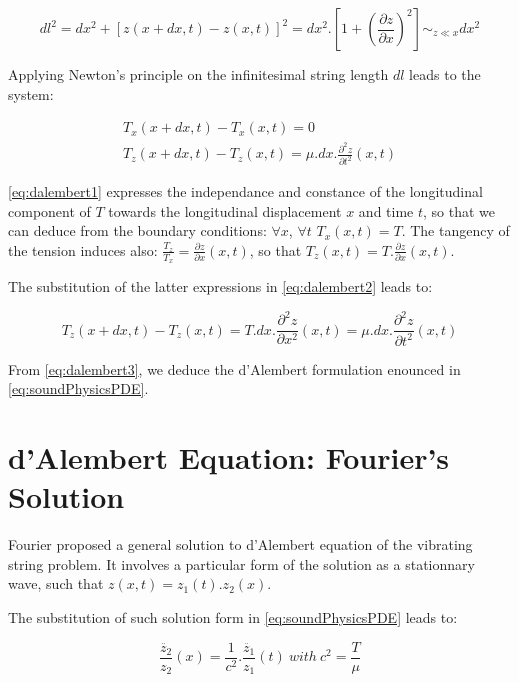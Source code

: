 $$
	dl^2 = dx^2 + [z(x+dx, t) - z(x, t)]^2 = dx^2 . [1 + (\frac{\partial{z}}{\partial{x}})^2] \sim_{z \ll x} dx^2
$$

Applying Newton's principle on the infinitesimal string length $dl$ leads to the system:

\begin{eqnarray}
	T_x(x+dx, t) - T_x(x, t) = 0  \label{eq:dalembert1} \\
   	T_z(x+dx, t) - T_z(x, t) = \mu . dx . \frac{\partial^2{z}}{\partial{t^2}}(x, t) \label{eq:dalembert2}
\end{eqnarray}

\myequname \eqref{eq:dalembert1} expresses the independance and constance of the longitudinal component of $T$ towards the longitudinal displacement $x$ and time $t$, so that we can deduce from the boundary conditions: $\forall x$, $\forall t$ $T_x(x, t) = T$. The tangency of the tension induces also: $\frac{T_z}{T_x} = \frac{\partial z}{\partial x}(x, t)$, so that $T_z(x, t) = T . \frac{\partial z}{\partial x}(x, t)$.

The substitution of the latter expressions in \myequname \eqref{eq:dalembert2} leads to:

\begin{equation}
	T_z(x+dx, t) - T_z(x, t) = T . dx . \frac{\partial^2 z}{\partial x^2}(x, t) = \mu . dx . \frac{\partial^2{z}}{\partial{t^2}}(x, t)
	\label{eq:dalembert3}
\end{equation}

From \myequname \eqref{eq:dalembert3}, we deduce the d'Alembert formulation enounced in \myequname \eqref{eq:soundPhysicsPDE}.


	\section{d'Alembert Equation: Fourier's Solution}
	\label{sec:ssDerivation_dalembertFourier}

Fourier proposed a general solution to d'Alembert equation of the vibrating string problem. It involves a particular form of the solution as a stationnary wave, such that $z(x, t) = z_1(t).z_2(x)$.

The substitution of such solution form in \myequname \eqref{eq:soundPhysicsPDE} leads to:

\begin{equation}
	\frac{\ddot{z_2}}{z_2}(x) = \frac{1}{c^2} . \frac{\ddot{z_1}}{z_1}(t)\ with\ c^2 = \frac{T}{\mu}
	\label{eq:fourier1}
\end{equation}

